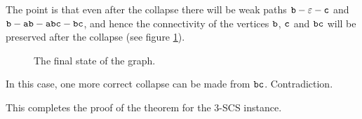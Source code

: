 The point is that even after the collapse there will be weak paths $ {\tt b} - \varepsilon - {\tt c} $ and $ {\tt b} - {\tt ab} - {\tt abc} - {\tt bc} $, and hence the connectivity of the vertices $ {\tt b} $, $ {\tt c} $ and $ {\tt bc} $ will be preserved after the collapse (see figure \ref{fig:lvl1final}).
\begin{figure}[ht]
\begin{center}

\end{center}

\caption{The final state of the graph.}\label{fig:lvl1final}
\end{figure}

In this case, one more correct collapse can be made from $ {\tt bc} $. Contradiction.

This completes the proof of the theorem for the $3$-SCS instance.